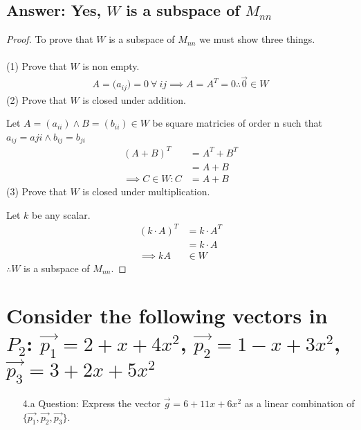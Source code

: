 \documentclass[12pt]{article}
\begin{document}
\subsection{Answer: Yes, $W$ is a subspace of $M_{nn}$}
\begin{proof}
        To prove that $W$ is a subspace of $M_{nn}$ we must show three things.\\\\
        (1) Prove that $W$ is non empty.
        \begin{align*}
                A=({a_{ij})=0}\ \forall\ ij \implies A = A^{T}=0 \therefore \vec{0} \in W
        \end{align*}
        (2) Prove that $W$ is closed under addition.

        Let $A = ({a_{ii}})\land B = ({b_{ii}})\in W$ be square matricies of order n such that $a_{ij}=a{ji}\land b_{ij} = b_{ji}$\
        \begin{align*}
                (A+B)^T             & = A^T+B^T \\
                                    & = A + B   \\
                \implies C\in W : C & = A+B
        \end{align*}
        (3) Prove that $W$ is closed under multiplication.

        Let ${k}$ be any scalar.
        \begin{align*}
                (k\cdot A)^{T} & = k\cdot A^{T} \\
                               & = k\cdot A     \\
                \implies kA    & \in W
        \end{align*}
        $\therefore W$ is a subspace of $M_{nn}$.
\end{proof} \pagebreak
\section{Consider the following vectors in $P_2$: $\vec{p_1} = 2 + x + 4x^2$, $\vec{p_2} = 1 - x + 3x^2$, $\vec{p_3} = 3 + 2x + 5x^2$}
\begin{enumerate}
        \item[4.a]Question: Express the vector $\vec{g} = 6 + 11x + 6x^2$ as a linear combination of $\{\vec{p_1},\vec{p_2},\vec{p_3}\}$.
\end{enumerate}
\end{document}
